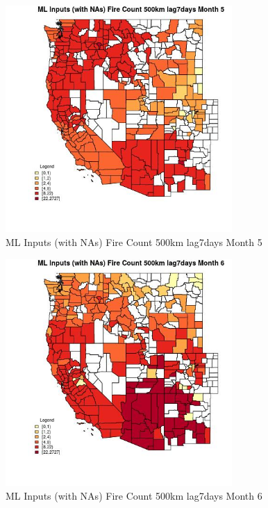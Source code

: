 \begin{figure} 
\centering  
\includegraphics[width=0.77\textwidth]{Code_Outputs/Report_ML_input_PM25_Step4_part_f_de_duplicated_aves_prioritize_24hr_obswNAs_CountyFire_Count_500km_lag7daysmedianMonth5.jpg} 
\caption{\label{fig:Report_ML_input_PM25_Step4_part_f_de_duplicated_aves_prioritize_24hr_obswNAsCountyFire_Count_500km_lag7daysmedianMonth5}ML Inputs (with NAs) Fire Count 500km lag7days Month 5} 
\end{figure} 
 

\begin{figure} 
\centering  
\includegraphics[width=0.77\textwidth]{Code_Outputs/Report_ML_input_PM25_Step4_part_f_de_duplicated_aves_prioritize_24hr_obswNAs_CountyFire_Count_500km_lag7daysmedianMonth6.jpg} 
\caption{\label{fig:Report_ML_input_PM25_Step4_part_f_de_duplicated_aves_prioritize_24hr_obswNAsCountyFire_Count_500km_lag7daysmedianMonth6}ML Inputs (with NAs) Fire Count 500km lag7days Month 6} 
\end{figure} 
 

